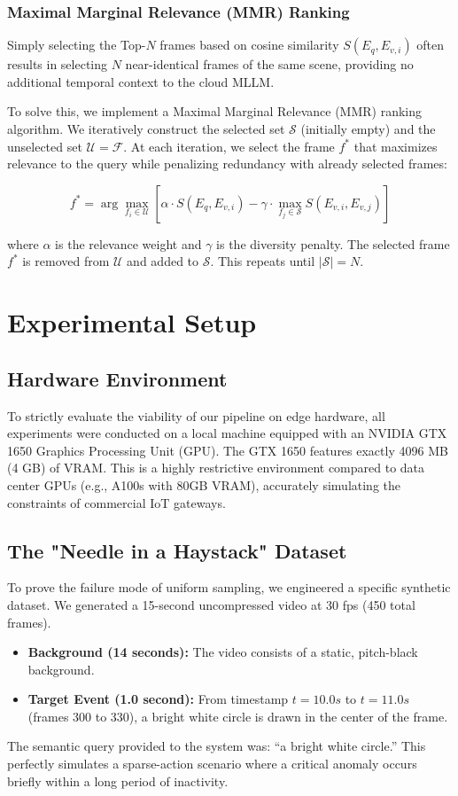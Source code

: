 \documentclass[12pt, a4paper]{report}
\begin{document}
\subsection{Maximal Marginal Relevance (MMR) Ranking}
Simply selecting the Top-$N$ frames based on cosine similarity $S(E_q, E_{v,i})$ often results in selecting $N$ near-identical frames of the same scene, providing no additional temporal context to the cloud MLLM.

To solve this, we implement a Maximal Marginal Relevance (MMR) ranking algorithm. We iteratively construct the selected set $\mathcal{S}$ (initially empty) and the unselected set $\mathcal{U} = \mathcal{F}$. At each iteration, we select the frame $f^*$ that maximizes relevance to the query while penalizing redundancy with already selected frames:

\begin{equation}
f^* = \arg\max_{f_i \in \mathcal{U}} \left[ \alpha \cdot S(E_q, E_{v,i}) - \gamma \cdot \max_{f_j \in \mathcal{S}} S(E_{v,i}, E_{v,j}) \right]
\end{equation}

where $\alpha$ is the relevance weight and $\gamma$ is the diversity penalty. The selected frame $f^*$ is removed from $\mathcal{U}$ and added to $\mathcal{S}$. This repeats until $|\mathcal{S}| = N$.

\chapter{Experimental Setup}

\section{Hardware Environment}
To strictly evaluate the viability of our pipeline on edge hardware, all experiments were conducted on a local machine equipped with an NVIDIA GTX 1650 Graphics Processing Unit (GPU). The GTX 1650 features exactly 4096 MB (4 GB) of VRAM. This is a highly restrictive environment compared to data center GPUs (e.g., A100s with 80GB VRAM), accurately simulating the constraints of commercial IoT gateways.

\section{The "Needle in a Haystack" Dataset}
To prove the failure mode of uniform sampling, we engineered a specific synthetic dataset. We generated a 15-second uncompressed video at 30 fps (450 total frames). 
\begin{itemize}
    \item \textbf{Background (14 seconds):} The video consists of a static, pitch-black background.
    \item \textbf{Target Event (1.0 second):} From timestamp $t=10.0s$ to $t=11.0s$ (frames 300 to 330), a bright white circle is drawn in the center of the frame.
\end{itemize}
The semantic query provided to the system was: ``a bright white circle.'' This perfectly simulates a sparse-action scenario where a critical anomaly occurs briefly within a long period of inactivity.
\end{document}
